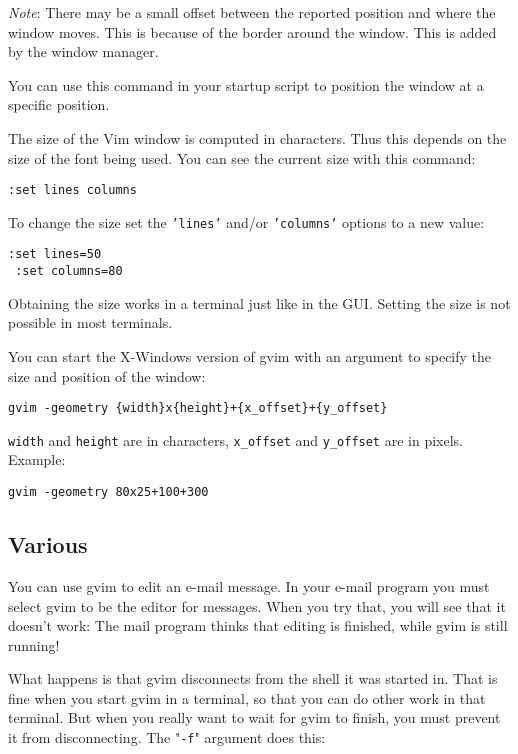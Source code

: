\emph{Note}: There may be a small offset between the reported position and where the window moves.
This is because of the border around the window.
This is added by the window manager.

You can use this command in your startup script to position the window at a specific position.

The size of the Vim window is computed in characters.
Thus this depends on the size of the font being used.
You can see the current size with this command:

\begin{Verbatim}[samepage=true]
 :set lines columns
\end{Verbatim}

To change the size set the \texttt{'lines'} and/or \texttt{'columns'} options to a new value:

\begin{Verbatim}[samepage=true]
 :set lines=50
 :set columns=80
\end{Verbatim}

Obtaining the size works in a terminal just like in the GUI.
Setting the size is not possible in most terminals.

You can start the X-Windows version of gvim with an argument to specify the size and position of the window:

\begin{Verbatim}[samepage=true]
 gvim -geometry {width}x{height}+{x_offset}+{y_offset}
\end{Verbatim}

\texttt{{width}} and \texttt{{height}} are in characters, \texttt{{x\_offset}} and \texttt{{y\_offset}} are in pixels.
Example:

\begin{Verbatim}[samepage=true]
 gvim -geometry 80x25+100+300
\end{Verbatim}
\subsection{Various}
You can use gvim to edit an e-mail message.
In your e-mail program you must select gvim to be the editor for messages.
When you try that, you will see that it doesn't work: The mail program thinks that editing is finished, while gvim is still running!

What happens is that gvim disconnects from the shell it was started in.
That is fine when you start gvim in a terminal, so that you can do other work in that terminal.
But when you really want to wait for gvim to finish, you must prevent it from disconnecting.
The "\texttt{-f}" argument does this:

